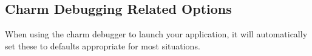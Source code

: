 \documentclass[10pt]{article}
\begin{document}


\subsection{Charm Debugging Related Options}

When using the charm debugger to launch your application, it will automatically
set these to defaults appropriate for most situations.
\end{document}
